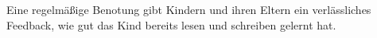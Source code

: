 Eine regelmäßige Benotung gibt Kindern und ihren Eltern ein verlässliches Feedback, wie gut das Kind bereits lesen und schreiben gelernt hat.